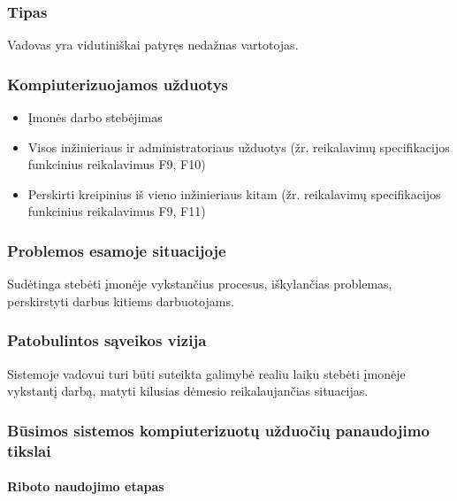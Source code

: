 			
		\subsubsection{Tipas}
		
		Vadovas yra vidutiniškai patyręs nedažnas vartotojas.
		
		
		\subsubsection{Kompiuterizuojamos užduotys}
		
		\begin{itemize}
			\item Įmonės darbo stebėjimas
			\item Visos inžinieriaus ir administratoriaus užduotys (žr. reikalavimų specifikacijos funkcinius reikalavimus F9, F10)
			\item Perskirti kreipinius iš vieno inžinieriaus kitam (žr. reikalavimų specifikacijos funkcinius reikalavimus F9, F11)
		\end{itemize}
		
		\subsubsection{Problemos esamoje situacijoje}
		
		Sudėtinga stebėti įmonėje vykstančius procesus, iškylančias problemas, perskirstyti darbus kitiems darbuotojams.
		
		
		\subsubsection{Patobulintos sąveikos vizija}
		
		Sistemoje vadovui turi būti suteikta galimybė realiu laiku stebėti įmonėje vykstantį darbą, matyti kilusias dėmesio reikalaujančias situacijas.
		
		
		\subsubsection{Būsimos sistemos kompiuterizuotų užduočių panaudojimo tikslai}
		
			\setcounter{tocdepth}{5} \setcounter{secnumdepth}{5}
			
			\paragraph{Riboto naudojimo etapas}
			
